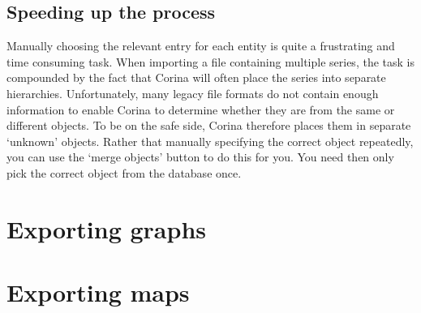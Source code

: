 \subsection{Speeding up the process}
Manually choosing the relevant entry for each entity is quite a frustrating and time consuming task.  When importing a file containing multiple series, the task is compounded by the fact that Corina will often place the series into separate hierarchies.  Unfortunately, many legacy file formats do not contain enough information to enable Corina to determine whether they are from the same or different objects.  To be on the safe side, Corina therefore places them in separate `unknown' objects.  Rather that manually specifying the correct object repeatedly, you can use the `merge objects' button to do this for you.  You need then only pick the correct object from the database once.



\section{Exporting graphs}



\section{Exporting maps}


